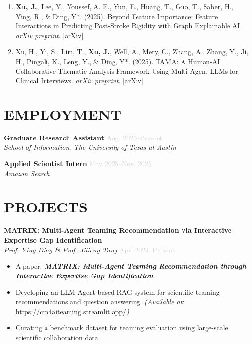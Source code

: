 \documentclass[a4paper,9pt]{extarticle}
\newcommand{\role}[1]{\textbf{\color{darkgray}#1}}
\newcommand{\institution}[1]{\textit{#1}}
\newcommand{\daterange}[1]{\textcolor{lightgray}{#1}}
\newcommand{\highlight}[1]{\textbf{#1}}
\begin{document}
\vspace{0.4cm}
\vspace{0.2cm}
\begin{enumerate}[resume,leftmargin=0.8cm]
    \item \textbf{Xu, J.}, Lee, Y., Youssef, A. E., Yun, E., Huang, T., Guo, T., Saber, H., Ying, R., \& Ding, Y*. (2025). Beyond Feature Importance: Feature Interactions in Predicting Post-Stroke Rigidity with Graph Explainable AI. \textit{arXiv preprint}. \href{https://arxiv.org/abs/2504.08150}{[arXiv]}
    \vspace{.2cm}
    \item Xu, H., Yi, S., Lim, T., \textbf{Xu, J.}, Well, A., Mery, C., Zhang, A., Zhang, Y., Ji, H., Pingali, K., Leng, Y., \& Ding, Y*. (2025). TAMA: A Human-AI Collaborative Thematic Analysis Framework Using Multi-Agent LLMs for Clinical Interviews. \textit{arXiv preprint}. \href{https://arxiv.org/abs/2503.20666}{[arXiv]}
    \vspace{.2cm}
\end{enumerate}




\section*{EMPLOYMENT}

\noindent
\role{Graduate Research Assistant} \hfill \daterange{Aug. 2023--Present} \\
\institution{School of Information, The University of Texas at Austin}

\vspace{0.4cm}
\noindent
\role{Applied Scientist Intern} \hfill \daterange{May 2025--Nov. 2025} \\
\institution{Amazon Search}

 
\section*{PROJECTS}

\noindent
\role{MATRIX: Multi-Agent Teaming Recommendation via Interactive Expertise Gap Identification} \\
\institution{Prof. Ying Ding \& Prof. Jiliang Tang} \hfill \daterange{Apr. 2024--Present}
\begin{itemize}[leftmargin=1em]
\item A paper: \textit{\highlight{MATRIX: Multi-Agent Teaming Recommendation through Interactive Expertise Gap Identification}}
\item Developing an LLM Agent-based RAG system for scientific teaming recommendations and question answering. \textit{(Available at:} \url{https://cm4aiteaming.streamlit.app/}\textit{)}
\item Curating a benchmark dataset for teaming evaluation using large-scale scientific collaboration data
\end{itemize}
\end{document}
